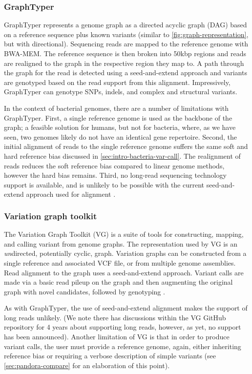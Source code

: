 \subsubsection{GraphTyper}
GraphTyper \cite{graphtyper,graphtyper2} represents a genome graph as a directed acyclic graph (DAG) based on a reference sequence plus known variants (similar to \autoref{fig:graph-representation}, but with directional). Sequencing reads are mapped to the reference genome with BWA-MEM. The reference sequence is then broken into 50kbp regions and reads are realigned to the graph in the respective region they map to. A path through the graph for the read is detected using a seed-and-extend approach and variants are genotyped based on the read support from this alignment. Impressively, GraphTyper can genotype SNPs, indels, and complex and structural variants.

In the context of bacterial genomes, there are a number of limitations with GraphTyper. First, a single reference genome is used as the backbone of the graph; a feasible solution for humans, but not for bacteria, where, as we have seen, two genomes likely do not have an identical gene repertoire. Second, the initial alignment of reads to the single reference genome suffers the same soft and hard reference bias discussed in \autoref{sec:intro-bacteria-var-call}. The realignment of reads reduces the soft reference bias compared to linear genome methods, however the hard bias remains. Third, no long-read sequencing technology support is available, and is unlikely to be possible with the current seed-and-extend approach used for alignment \cite{li2018}. 

\subsubsection{Variation graph toolkit}
The Variation Graph Toolkit (VG) \cite{vg2018} is a suite of tools for constructing, mapping, and calling variant from genome graphs. The representation used by VG is an \emph{un}directed, potentially cyclic, graph. Variation graphs can be constructed from a single reference and associated VCF file, or from multiple genome assemblies. Read alignment to the graph uses a seed-and-extend approach. Variant calls are made via a basic read pileup on the graph and then augmenting the original graph with novel candidates, followed by genotyping \cite{Novak2017}.

As with GraphTyper, the use of seed-and-extend alignment makes the support of long reads unlikely. (We note there has discussions within the VG GitHub repository for 4 years about supporting long reads, however, as yet, no support has been announced). Another limitation of VG is that in order to produce variant calls, the user must provide a reference genome, again, either inheriting reference bias or requiring a verbose description of simple variants (see \autoref{sec:pandora-compare} for an elaboration of this point).

